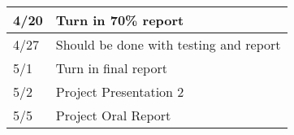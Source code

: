 \begin{center}
\begin{adjustwidth}[]{-1in}{-1in}
\begin{table}[H]
\begin{tabularx}{\textwidth}{| p{3cm} | X |}
      4/20 & \textbf{Turn in 70\% report} \\ \hline

      4/27 & Should be done with testing and report \\ \hline

      5/1 & Turn in final report \\ \hline
  
      5/2 & Project Presentation 2 \\ \hline
   
      5/5 & Project Oral Report \\ \hline

    \end{tabularx}
  \end{table}
\end{adjustwidth}
\end{center}
